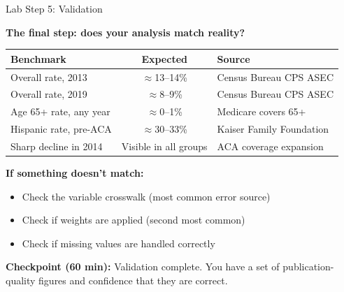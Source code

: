 \documentclass[10pt,english,aspectratio=169]{beamer}
\begin{document}
\begin{frame}{Lab Step 5: Validation}

\textbf{The final step: does your analysis match reality?}

\vspace{0.3cm}
\begin{small}
\begin{tabular}{lcl}
\toprule
\textbf{Benchmark} & \textbf{Expected} & \textbf{Source} \\
\midrule
Overall rate, 2013 & $\approx$13--14\% & Census Bureau CPS ASEC \\
Overall rate, 2019 & $\approx$8--9\% & Census Bureau CPS ASEC \\
Age 65+ rate, any year & $\approx$0--1\% & Medicare covers 65+ \\
Hispanic rate, pre-ACA & $\approx$30--33\% & Kaiser Family Foundation \\
Sharp decline in 2014 & Visible in all groups & ACA coverage expansion \\
\bottomrule
\end{tabular}
\end{small}

\vspace{0.3cm}
\textbf{If something doesn't match:}
\begin{itemize}
    \item Check the variable crosswalk (most common error source)
    \item Check if weights are applied (second most common)
    \item Check if missing values are handled correctly
\end{itemize}

\vspace{0.2cm}
\textbf{Checkpoint (60 min):} Validation complete. You have a set of publication-quality figures and confidence that they are correct.

\end{frame}
\end{document}
